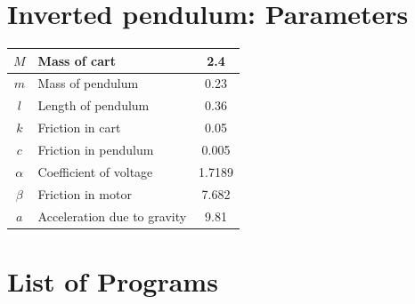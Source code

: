 \documentclass[12pt]{article}
\begin{document}

\section{Inverted pendulum: Parameters}

\begin{center}
\begin{tabular}{|c|l|c|}
\hline
$M$ & Mass of cart &  2.4  \\
\hline
$m$ & Mass of pendulum &  0.23 \\
\hline
$l$ & Length of pendulum & 0.36 \\
\hline
$k$ & Friction in cart & 0.05 \\
\hline
$c$ & Friction in pendulum & 0.005 \\
\hline
$\alpha$ & Coefficient of voltage & 1.7189 \\
\hline
$\beta$ &  Friction in motor &  7.682 \\
\hline
$a$ & Acceleration due to gravity & 9.81 \\
\hline
\end{tabular}
\end{center}

\section{List of Programs}
\end{document}
